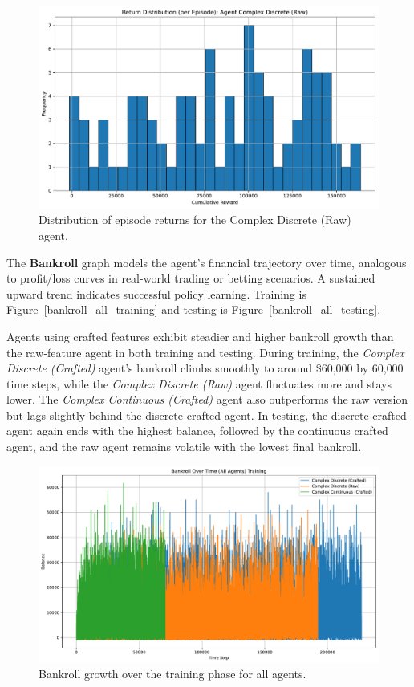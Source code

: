 \documentclass[sigconf]{acmart}
\begin{document}
\begin{figure}[t]
  \centering
  \includegraphics[width=\textwidth]{return_distribution_Complex Discrete (Raw).pdf}
  \caption{Distribution of episode returns for the Complex Discrete (Raw) agent.}
  \label{fig:return_distribution_Complex Discrete (Raw)}
\end{figure}

The \textbf{Bankroll} graph models the agent's financial trajectory over time, analogous to profit/loss curves in real-world trading or betting scenarios. A sustained upward trend indicates successful policy learning. Training is Figure~\ref{bankroll_all_training} and testing is Figure~\ref{bankroll_all_testing}.

\bigskip

Agents using crafted features exhibit steadier and higher bankroll growth than the raw‐feature agent in both training and testing. During training, the \emph{Complex Discrete (Crafted)} agent’s bankroll climbs smoothly to around \$60{,}000 by 60{,}000 time steps, while the \emph{Complex Discrete (Raw)} agent fluctuates more and stays lower. The \emph{Complex Continuous (Crafted)} agent also outperforms the raw version but lags slightly behind the discrete crafted agent. In testing, the discrete crafted agent again ends with the highest balance, followed by the continuous crafted agent, and the raw agent remains volatile with the lowest final bankroll.

\bigskip

\begin{figure}[t]
  \centering
  \includegraphics[width=\textwidth]{bankroll_all_training.pdf}
  \caption{Bankroll growth over the training phase for all agents.}
  \label{fig:bankroll_all_training}
\end{figure}
\end{document}
